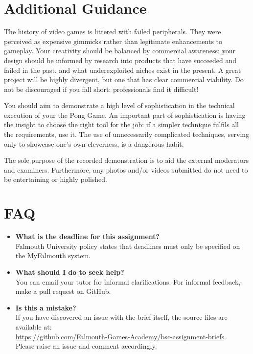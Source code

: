 \documentclass{../../fal_assignment}
\begin{document}
	\section*{Additional Guidance}
	
	The history of video games is littered with failed peripherals. They were perceived as expensive gimmicks rather than legitimate enhancements to gameplay. Your creativity should be balanced by commercial awareness: your design should be informed by research into products that have succeeded and failed in the past, and what underexploited niches exist in the present. A great project will be highly divergent, but one that has clear commercial viability. Do not be discouraged if you fall short: professionals find it difficult! 
	
	You should aim to demonstrate a high level of sophistication in the technical execution of your the Pong Game. An important part of sophistication is having the insight to choose the right tool for the job: if a simpler technique fulfils all the requirements, use it. The use of unnecessarily complicated techniques, serving only to showcase one's own cleverness, is a dangerous habit. 
	
	The sole purpose of the recorded demonstration is to aid the external moderators and examiners. Furthermore, any photos and/or videos submitted do not need to be entertaining or highly polished.
	
	\section*{FAQ}
	
	\begin{itemize}
		\item 	\textbf{What is the deadline for this assignment?} \\ 
		Falmouth University policy states that deadlines must only be specified on the MyFalmouth system.
		
		\item 	\textbf{What should I do to seek help?} \\ 
		You can email your tutor for informal clarifications. For informal feedback, make a pull request on GitHub. 
		
		\item 	\textbf{Is this a mistake?} \\ 	
		If you have discovered an issue with the brief itself, the source files are available at: \\
		\url{https://github.com/Falmouth-Games-Academy/bsc-assignment-briefs}.\\
		Please raise an issue and comment accordingly.
	\end{itemize}
	
\end{document}
